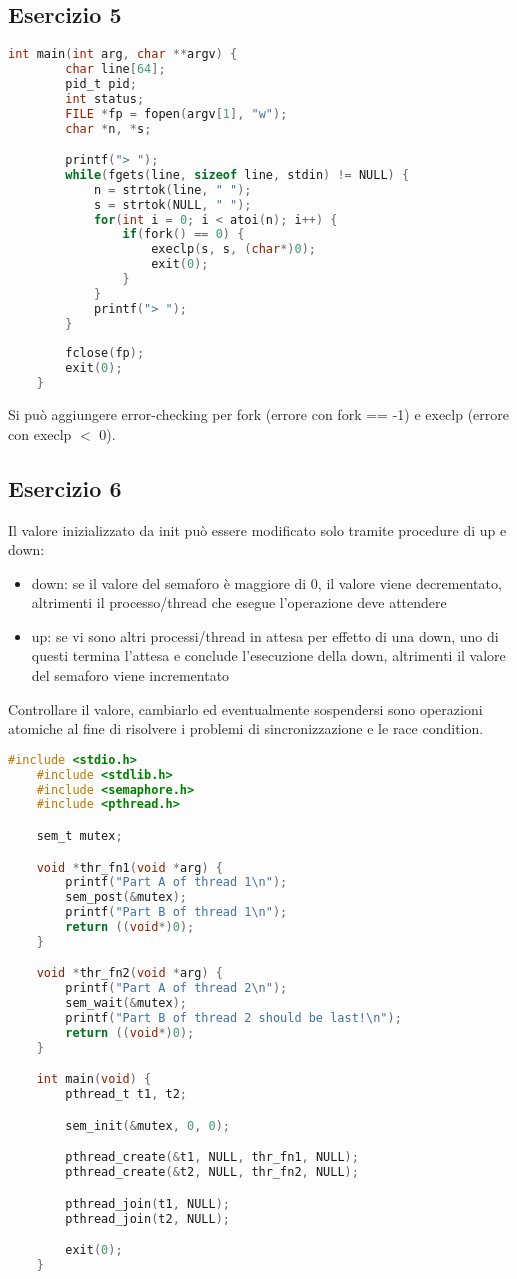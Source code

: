 \documentclass[12pt]{article}
\begin{document}
\subsection*{Esercizio 5}
\begin{lstlisting}[language=c]
    int main(int arg, char **argv) {
        char line[64];
        pid_t pid;
        int status;
        FILE *fp = fopen(argv[1], "w");
        char *n, *s;

        printf("> ");
        while(fgets(line, sizeof line, stdin) != NULL) {
            n = strtok(line, " ");
            s = strtok(NULL, " ");
            for(int i = 0; i < atoi(n); i++) {
                if(fork() == 0) {
                    execlp(s, s, (char*)0);
                    exit(0);
                }
            }
            printf("> ");
        }
        
        fclose(fp);
        exit(0);
    }
\end{lstlisting}
Si può aggiungere error-checking per fork (errore con fork == -1) e execlp (errore con execlp $<$ 0).
\subsection*{Esercizio 6}
Il valore inizializzato da init può essere modificato solo tramite procedure di up e down:
\begin{itemize}
    \item down: se il valore del semaforo è maggiore di 0, il valore viene decrementato, altrimenti il processo/thread 
    che esegue l'operazione deve attendere
    \item up: se vi sono altri processi/thread in attesa per effetto di una down, uno di questi termina l'attesa e conclude 
    l'esecuzione della down, altrimenti il valore del semaforo viene incrementato
\end{itemize}
Controllare il valore, cambiarlo ed eventualmente sospendersi sono operazioni atomiche al fine di risolvere i problemi 
di sincronizzazione e le race condition.
\begin{lstlisting}[language=c]
    #include <stdio.h>
    #include <stdlib.h>
    #include <semaphore.h>
    #include <pthread.h>

    sem_t mutex;

    void *thr_fn1(void *arg) {
        printf("Part A of thread 1\n");
        sem_post(&mutex);
        printf("Part B of thread 1\n");
        return ((void*)0);
    }

    void *thr_fn2(void *arg) {
        printf("Part A of thread 2\n");
        sem_wait(&mutex);
        printf("Part B of thread 2 should be last!\n");
        return ((void*)0);
    }

    int main(void) {
        pthread_t t1, t2;

        sem_init(&mutex, 0, 0);

        pthread_create(&t1, NULL, thr_fn1, NULL);
        pthread_create(&t2, NULL, thr_fn2, NULL);

        pthread_join(t1, NULL);
        pthread_join(t2, NULL);

        exit(0);
    }
\end{lstlisting}
\end{document}
